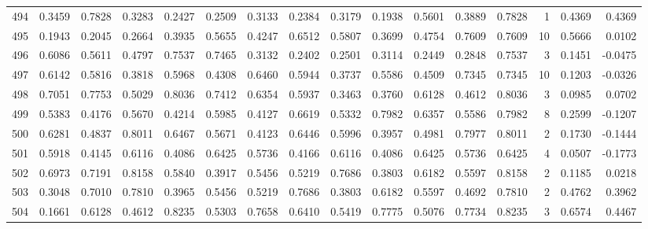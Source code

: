 \begin{tabular}{lrrrrrrrrrrrrrrr}
494 &      0.3459 &  0.7828 &  0.3283 &  0.2427 &  0.2509 &  0.3133 &  0.2384 &  0.3179 &  0.1938 &  0.5601 &   0.3889 &     0.7828 &      1 &                    0.4369 &                     0.4369 \\
495 &      0.1943 &  0.2045 &  0.2664 &  0.3935 &  0.5655 &  0.4247 &  0.6512 &  0.5807 &  0.3699 &  0.4754 &   0.7609 &     0.7609 &     10 &                    0.5666 &                     0.0102 \\
496 &      0.6086 &  0.5611 &  0.4797 &  0.7537 &  0.7465 &  0.3132 &  0.2402 &  0.2501 &  0.3114 &  0.2449 &   0.2848 &     0.7537 &      3 &                    0.1451 &                    -0.0475 \\
497 &      0.6142 &  0.5816 &  0.3818 &  0.5968 &  0.4308 &  0.6460 &  0.5944 &  0.3737 &  0.5586 &  0.4509 &   0.7345 &     0.7345 &     10 &                    0.1203 &                    -0.0326 \\
498 &      0.7051 &  0.7753 &  0.5029 &  0.8036 &  0.7412 &  0.6354 &  0.5937 &  0.3463 &  0.3760 &  0.6128 &   0.4612 &     0.8036 &      3 &                    0.0985 &                     0.0702 \\
499 &      0.5383 &  0.4176 &  0.5670 &  0.4214 &  0.5985 &  0.4127 &  0.6619 &  0.5332 &  0.7982 &  0.6357 &   0.5586 &     0.7982 &      8 &                    0.2599 &                    -0.1207 \\
500 &      0.6281 &  0.4837 &  0.8011 &  0.6467 &  0.5671 &  0.4123 &  0.6446 &  0.5996 &  0.3957 &  0.4981 &   0.7977 &     0.8011 &      2 &                    0.1730 &                    -0.1444 \\
501 &      0.5918 &  0.4145 &  0.6116 &  0.4086 &  0.6425 &  0.5736 &  0.4166 &  0.6116 &  0.4086 &  0.6425 &   0.5736 &     0.6425 &      4 &                    0.0507 &                    -0.1773 \\
502 &      0.6973 &  0.7191 &  0.8158 &  0.5840 &  0.3917 &  0.5456 &  0.5219 &  0.7686 &  0.3803 &  0.6182 &   0.5597 &     0.8158 &      2 &                    0.1185 &                     0.0218 \\
503 &      0.3048 &  0.7010 &  0.7810 &  0.3965 &  0.5456 &  0.5219 &  0.7686 &  0.3803 &  0.6182 &  0.5597 &   0.4692 &     0.7810 &      2 &                    0.4762 &                     0.3962 \\
504 &      0.1661 &  0.6128 &  0.4612 &  0.8235 &  0.5303 &  0.7658 &  0.6410 &  0.5419 &  0.7775 &  0.5076 &   0.7734 &     0.8235 &      3 &                    0.6574 &                     0.4467 \\

\end{tabular}
